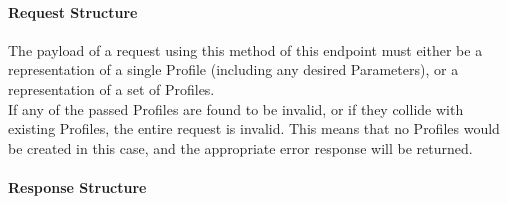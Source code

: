 \paragraph{Request Structure}
The payload of a request using this method of this endpoint must either be a
representation of a single Profile (including any desired Parameters), or a
representation of a set of Profiles.\\
If any of the passed Profiles are found to be invalid, or if they collide with
existing Profiles, the entire request is invalid. This means that no Profiles
would be created in this case, and the appropriate error response will be
returned.

\paragraph{Response Structure}

\subsection{}
